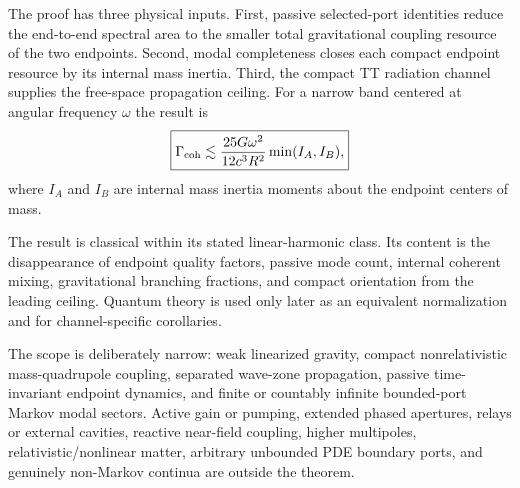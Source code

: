 The proof has three physical inputs. First, passive selected-port identities reduce the end-to-end spectral area to the smaller total gravitational coupling resource of the two endpoints. Second, modal completeness closes each compact endpoint resource by its internal mass inertia. Third, the compact TT radiation channel supplies the free-space propagation ceiling. For a narrow band centered at angular frequency $\omega$ the result is
\begin{equation}
\boxed{
\Gamma_{\rm coh}
\lesssim
\frac{25G\omega^2}{12c^3R^2}
\min(I_A,I_B),}
\label{eq:headline}
\end{equation}
where $I_A$ and $I_B$ are internal mass inertia moments about the endpoint centers of mass.

The result is classical within its stated linear-harmonic class. Its content is the disappearance of endpoint quality factors, passive mode count, internal coherent mixing, gravitational branching fractions, and compact orientation from the leading ceiling. Quantum theory is used only later as an equivalent normalization and for channel-specific corollaries.

The scope is deliberately narrow: weak linearized gravity, compact nonrelativistic mass-quadrupole coupling, separated wave-zone propagation, passive time-invariant endpoint dynamics, and finite or countably infinite bounded-port Markov modal sectors. Active gain or pumping, extended phased apertures, relays or external cavities, reactive near-field coupling, higher multipoles, relativistic/nonlinear matter, arbitrary unbounded PDE boundary ports, and genuinely non-Markov continua are outside the theorem.